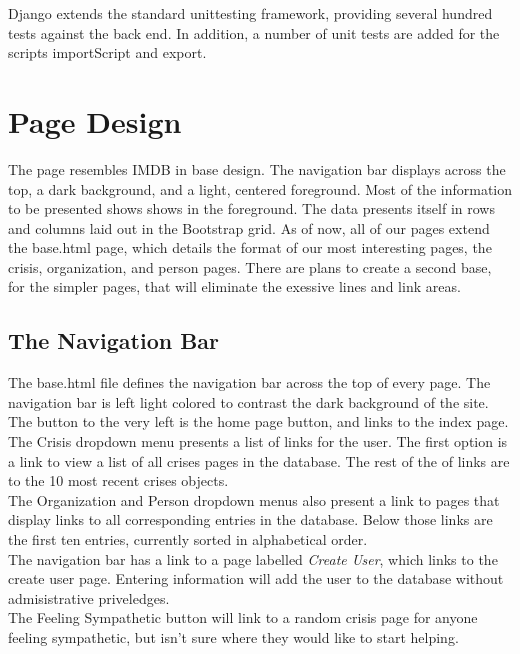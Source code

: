 \documentclass[12pt]{report}
\begin{document}
Django extends the standard unittesting framework, providing several hundred tests against the back end.
In addition, a number of unit tests are added for the scripts importScript and export.


\newpage
\section*{Page Design}
\hfill


The page resembles IMDB in base design.
The navigation bar displays across the top, a dark background, and a light, centered foreground.
Most of the information to be presented shows shows in the foreground.
The data presents itself in rows and columns laid out in the Bootstrap grid.
As of now, all of our pages extend the base.html page,
which details the format of our most interesting pages, the crisis, organization, and person pages.
There are plans to create a second base, for the simpler pages, that will eliminate the exessive
lines and link areas.
\\


\subsection*{The Navigation Bar}
\hfill

The base.html file defines the navigation bar across the top of every page.
The navigation bar is left light colored to contrast the dark background of the site.
The button to the very left is the home page button, and links to the index page.
\\


The Crisis dropdown menu presents a list of links for the user.
The first option is a link to view a list of all crises pages in the database.
The rest of the of links are to the 10 most recent crises objects.
\\


The Organization and Person dropdown menus also present a link to pages
that display links to all corresponding entries in the database.
Below those links are the first ten entries, currently sorted in alphabetical order.
\\


The navigation bar has a link to a page labelled \emph{Create User}, which links to the
create user page.  Entering information will add the user to the database without
admisistrative priveledges.
\\


The Feeling Sympathetic button will link to a random crisis page for anyone feeling sympathetic,
but isn't sure where they would like to start helping.
\\
\end{document}
